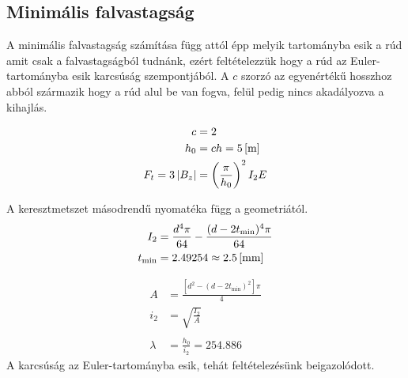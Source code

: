 \newpage

\subsection{Minimális falvastagság}
A minimális falvastagság számítása függ attól épp melyik tartományba esik a rúd amit csak a falvastagságból tudnánk, ezért feltételezzük hogy a rúd az Euler-tartományba esik karcsúság szempontjából. A $c$ szorzó az egyenértékű hosszhoz abból származik hogy a rúd alul be van fogva, felül pedig nincs akadályozva a kihajlás.

\begin{align*}
	c &= 2 \\
	h_0 &= ch = \m{5} \\
	F_t = 3\left|B_z\right| &= \left(\frac{\pi}{h_0}\right)^2 I_2 E 
\end{align*}

A keresztmetszet másodrendű nyomatéka függ a geometriától.
\begin{align*}
	I_2 &= \frac{d^4 \pi}{64} - \frac{(d-2t_\text{min})^4 \pi}{64} \\
	t_\text{min} &= 2.49254 \approx \mm{2.5}
\end{align*}

\begin{align*}
	A &= \frac{\left[d^2 - (d-2t_\text{min})^2\right] \pi}{4} \\
	i_2 &= \sqrt{\frac{I_2}{A}} \\ \\
	\lambda &= \frac{h_0}{i_2} = 254.886
\end{align*}
A karcsúság az Euler-tartományba esik, tehát feltételezésünk beigazolódott.
